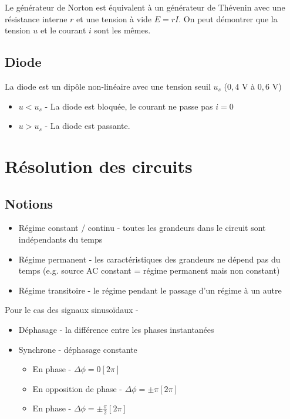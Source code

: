 \documentclass[openany]{book}
\begin{document}
\noindent Le générateur de Norton est équivalent à un générateur de Thévenin avec une résistance interne $r$ et une tension à vide $ E = rI $. On peut démontrer que la tension $u$ et le courant $i$ sont les mêmes. 

\subsection{Diode}
La diode est un dipôle non-linéaire avec une tension seuil $u_s$ ($0,4 \text{ V}$ à $0,6 \text{ V}$)
\begin{itemize}
    \item $u < u_s$ - La diode est bloquée, le courant ne passe pas $i=0$
    \item $u > u_s$ - La diode est passante. 
\end{itemize}


\section{Résolution des circuits}

\subsection{Notions}
\begin{itemize}
    \item Régime constant / continu - toutes les grandeurs dans le circuit sont indépendants du temps
    \item Régime permanent - les caractéristiques des grandeurs ne dépend pas du temps (e.g. source AC constant = régime permanent mais non constant)
    \item Régime transitoire - le régime pendant le passage d'un régime à un autre
\end{itemize}

\noindent Pour le cas des signaux sinusoïdaux -
\begin{itemize}
    \item Déphasage - la différence entre les phases instantanées
    \item Synchrone - déphasage constante
    \begin{itemize}
        \item En phase - $\Delta\phi = 0[2\pi]$
        \item En opposition de phase - $\Delta\phi = \pm\pi[2\pi]$
        \item En phase - $\Delta\phi = \pm\frac{\pi}{2}[2\pi]$
    \end{itemize}
\end{itemize}
\end{document}
